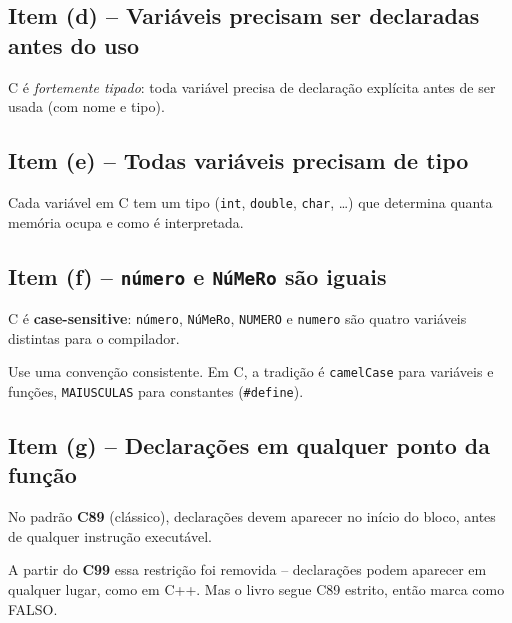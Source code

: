 \documentclass[12pt,a4paper]{article}
\begin{document}
\subsection*{Item (d) -- Variáveis precisam ser declaradas antes do uso}
\begin{tcolorbox}[colback=green!5,colframe=deitelgreen,title={\bfseries VERDADEIRO}]
C é \textit{fortemente tipado}: toda variável precisa de declaração explícita antes
de ser usada (com nome e tipo).
\end{tcolorbox}

\subsection*{Item (e) -- Todas variáveis precisam de tipo}
\begin{tcolorbox}[colback=green!5,colframe=deitelgreen,title={\bfseries VERDADEIRO}]
Cada variável em C tem um tipo (\texttt{int}, \texttt{double}, \texttt{char}, \ldots)
que determina quanta memória ocupa e como é interpretada.
\end{tcolorbox}

\subsection*{Item (f) -- \texttt{número} e \texttt{NúMeRo} são iguais}
\begin{tcolorbox}[colback=red!5,colframe=deitelred,title={\bfseries FALSO}]
C é \textbf{case-sensitive}: \texttt{número}, \texttt{NúMeRo}, \texttt{NUMERO} e
\texttt{numero} são quatro variáveis distintas para o compilador.

\begin{boaprática}
  Use uma convenção consistente. Em C, a tradição é \texttt{camelCase} para
  variáveis e funções, \texttt{MAIUSCULAS} para constantes (\texttt{\#define}).
\end{boaprática}
\end{tcolorbox}

\subsection*{Item (g) -- Declarações em qualquer ponto da função}
\begin{tcolorbox}[colback=red!5,colframe=deitelred,title={\bfseries FALSO (em C89)}]
No padrão \textbf{C89} (clássico), declarações devem aparecer no início do bloco,
antes de qualquer instrução executável.

A partir do \textbf{C99} essa restrição foi removida -- declarações podem aparecer
em qualquer lugar, como em C++. Mas o livro segue C89 estrito, então marca como FALSO.
\end{tcolorbox}
\end{document}
